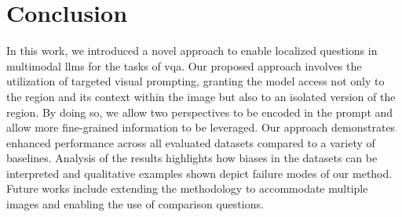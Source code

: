 \section{Conclusion}
\label{sec:locvqallm_conclusion}

In this work, we introduced a novel approach to enable localized questions in multimodal \glspl{llm} for the tasks of \gls{vqa}. Our proposed approach involves the utilization of targeted visual prompting, granting the model access not only to the region and its context within the image but also to an isolated version of the region. By doing so, we allow two perspectives to be encoded in the prompt and allow more fine-grained information to be leveraged. Our approach demonstrates enhanced performance across all evaluated datasets compared to a variety of baselines. Analysis of the results highlights how biases in the datasets can be interpreted and qualitative examples shown depict failure modes of our method. Future works include extending the methodology to accommodate multiple images and enabling the use of comparison questions.
